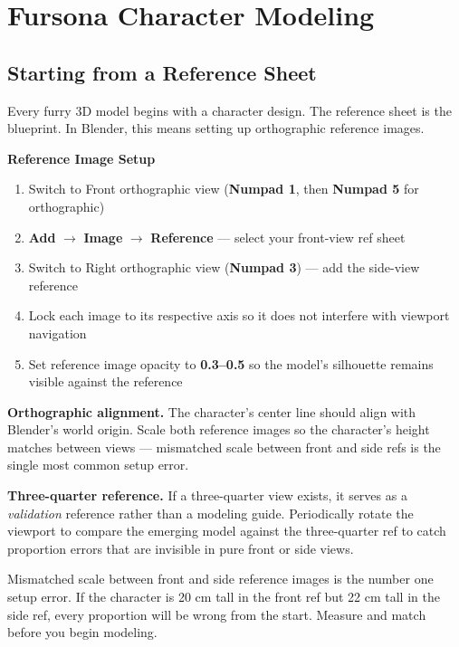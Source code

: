 \section{Fursona Character Modeling}
\label{sec:furry-modeling}

\subsection{Starting from a Reference Sheet}

Every furry 3D model begins with a character design. The reference sheet is the blueprint. In Blender, this means setting up orthographic reference images.

\begin{shortcutbox}
\textbf{Reference Image Setup}
\begin{enumerate}[leftmargin=2em]
  \item Switch to Front orthographic view (\textbf{Numpad 1}, then \textbf{Numpad 5} for orthographic)
  \item \textbf{Add} $\rightarrow$ \textbf{Image} $\rightarrow$ \textbf{Reference} --- select your front-view ref sheet
  \item Switch to Right orthographic view (\textbf{Numpad 3}) --- add the side-view reference
  \item Lock each image to its respective axis so it does not interfere with viewport navigation
  \item Set reference image opacity to \textbf{0.3--0.5} so the model's silhouette remains visible against the reference
\end{enumerate}
\end{shortcutbox}

\textbf{Orthographic alignment.} The character's center line should align with Blender's world origin. Scale both reference images so the character's height matches between views --- mismatched scale between front and side refs is the single most common setup error.

\textbf{Three-quarter reference.} If a three-quarter view exists, it serves as a \emph{validation} reference rather than a modeling guide. Periodically rotate the viewport to compare the emerging model against the three-quarter ref to catch proportion errors that are invisible in pure front or side views.

\begin{warningbox}
Mismatched scale between front and side reference images is the number one setup error. If the character is 20 cm tall in the front ref but 22 cm tall in the side ref, every proportion will be wrong from the start. Measure and match before you begin modeling.
\end{warningbox}


